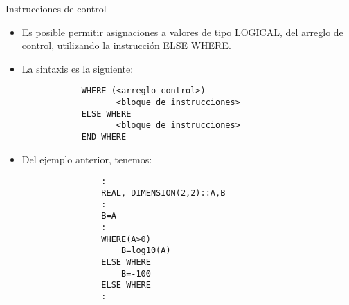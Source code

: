 \begin{frame}[fragile]{Instrucciones de control} 
    \begin{itemize}[<+(0)->]
        \item Es posible permitir asignaciones a valores de tipo LOGICAL, del arreglo de control, utilizando la instrucción ELSE WHERE.
        \item La sintaxis es la siguiente: \\
          \vspace{0.1cm}
            \begin{verbatim}
            WHERE (<arreglo control>)
                   <bloque de instrucciones> 
            ELSE WHERE 
                   <bloque de instrucciones>
            END WHERE
            \end{verbatim}
        \item [] Del ejemplo anterior, tenemos:
            \begin{verbatim}
                :
                REAL, DIMENSION(2,2)::A,B
                :
                B=A
                :
                WHERE(A>0) 
                    B=log10(A)
                ELSE WHERE
                    B=-100
                ELSE WHERE
                :
            \end{verbatim} 
    \end{itemize}
\end{frame}


